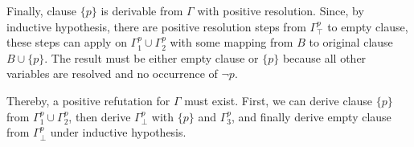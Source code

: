 \documentclass[11pt]{homework}
\begin{document}
\begin{induction}
Finally, clause \(\{p\}\) is derivable from \(\Gamma\) with positive resolution.
Since, by inductive hypothesis, there are positive resolution steps from \(\Gamma^p_\top\) to empty clause, these steps can apply on \(\Gamma^p_1 \cup \Gamma^p_2\) with some mapping from \(B\) to original clause \(B \cup \{p\}\).
The result must be either empty clause or \(\{p\}\) because all other variables are resolved and no occurrence of \(\neg p\).

Thereby, a positive refutation for \(\Gamma\) must exist.
First, we can derive clause \(\{p\}\) from \(\Gamma^p_1 \cup \Gamma^p_2\),
then derive \(\Gamma^p_\bot\) with \(\{p\}\) and \(\Gamma^p_3\),
and finally derive empty clause from \(\Gamma^p_\bot\) under inductive hypothesis.

\end{induction}
\end{document}
